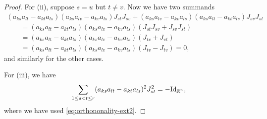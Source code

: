 \documentclass[pdftex]{sigma}
\numberwithin{equation}{section}
\begin{document}
\begin{proof}
For (ii), suppose $s=u$ but $t\not=v$. Now we have two summands
\begin{gather*}
 (a_{k s} a_{l t} - a_{k t} a_{l s}) (a_{k s} a_{l v} - a_{k v} a_{l s}) J_{s t} J_{s v}
 + (a_{k s} a_{l v} - a_{k v} a_{l s}) (a_{k s} a_{l t} - a_{k t} a_{l s}) J_{s v} J_{s t}\\
 \qquad{} = (a_{k s} a_{l t} - a_{k t} a_{l s}) (a_{k s} a_{l v} - a_{k v} a_{l s})
 (J_{s t} J_{s v}+J_{s v} J_{s t}) \\
 \qquad{} = (a_{k s} a_{l t} - a_{k t} a_{l s}) (a_{k s} a_{l v} - a_{k v} a_{l s})
 (J_{tv}+J_{vt}) \\
 \qquad{} = (a_{k s} a_{l t} - a_{k t} a_{l s}) (a_{k s} a_{l v} - a_{k v} a_{l s}) (J_{tv}-J_{tv}) =0,
\end{gather*}
and similarly for the other cases.

For (iii), we have
\begin{gather*}
 \sum_{1\leq s< t\leq r}(a_{ks}a_{lt} -a_{kt}a_{ls})^2 J_{st}^2 = -{\rm Id}_{\mathbb{R}^n},
\end{gather*}
where we have used \eqref{eq:orthononality-ext2}.
\end{proof}
\end{document}
